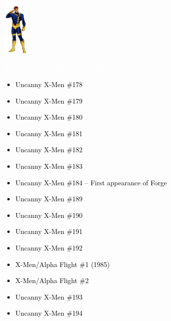 \documentclass[12pt]{article}
\newcommand{\checkbox}{\raisebox{0.0ex}{\fbox{\rule{0ex}{1.5ex} \rule{1.5ex}{0ex}}}}
\begin{document}
\begin{center}
    \vspace*{2cm}
    \includegraphics[width=0.1\textwidth]{cyclops.png}
    \vspace{0.3cm}

    {\Huge \textbf{\textcolor{white}{X-Men Chronological Checklist}}}
\end{center}

\vspace{0.3cm}
\noindent
\begin{tcolorbox}[
  colback=white!95!gray,
  colframe=black,
  width=\textwidth,
  arc=4mm,
  auto outer arc,
  boxrule=0.8pt,
  left=8pt,right=8pt,top=8pt,bottom=8pt
]
\begin{itemize}[left=0pt,label={\checkbox}]
  \item \textcolor{black}{Uncanny X-Men \#178}
  \item \textcolor{black}{Uncanny X-Men \#179}
  \item \textcolor{black}{Uncanny X-Men \#180}
  \item \textcolor{black}{Uncanny X-Men \#181}
  \item \textcolor{black}{Uncanny X-Men \#182}
  \item \textcolor{black}{Uncanny X-Men \#183}
  \item \textcolor{black}{Uncanny X-Men \#184 – First appearance of Forge}
  \item \textcolor{black}{Uncanny X-Men \#189}
  \item \textcolor{black}{Uncanny X-Men \#190}
  \item \textcolor{black}{Uncanny X-Men \#191}
  \item \textcolor{black}{Uncanny X-Men \#192}
  \item \textcolor{black}{X-Men/Alpha Flight \#1 (1985)}
  \item \textcolor{black}{X-Men/Alpha Flight \#2}
  \item \textcolor{black}{Uncanny X-Men \#193}
  \item \textcolor{black}{Uncanny X-Men \#194}
\end{itemize}
\end{tcolorbox}
\end{document}
